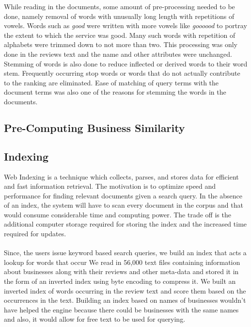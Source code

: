 \documentclass[paper=letter, fontsize=15pt]{article} %
\begin{document}
While reading in the documents, some amount of pre-processing needed to be done, namely removal of words with unusually long length with repetitions of vowels. Words such as \textit{good} were written with more vowels like \textit{goooood} to portray the extent to which the service was good. Many such words with repetition of alphabets were trimmed down to not more than two. This processing was only done in the reviews text and the name and other attributes were unchanged. Stemming\cite{sstem} of words is also done to  reduce inflected or derived words to their word stem. Frequently occurring stop words or words that do not actually contribute to the ranking are eliminated. Ease of matching of query terms with the document terms was also one of the reasons for stemming the words in the documents.

\subsection{Pre-Computing Business Similarity}


\subsection{Indexing}
Web Indexing\cite{sindex} is a technique which collects, parses, and stores data for efficient and fast information retrieval. The motivation  is to optimize speed and performance for finding relevant documents given a search query. In the absence of an index, the system will have to scan every document in the corpus and that would consume considerable time and computing power. The trade off  is the additional computer storage required for storing the index and the increased time required for updates. 

\paragraph{}Since, the users issue keyword based search queries, we build an index that acts a lookup for words that occur  We read in 56,000 text files containing information about businesses along with their reviews and other meta-data and stored it in the form of an inverted index using byte encoding to compress it. We built an inverted index of words occurring in the review text and score them based on the occurrences in the text. Building an index based on names of businesses wouldn't have helped the engine because there could be businesses with the same names and also, it would allow for free text to be used for querying.
\end{document}
